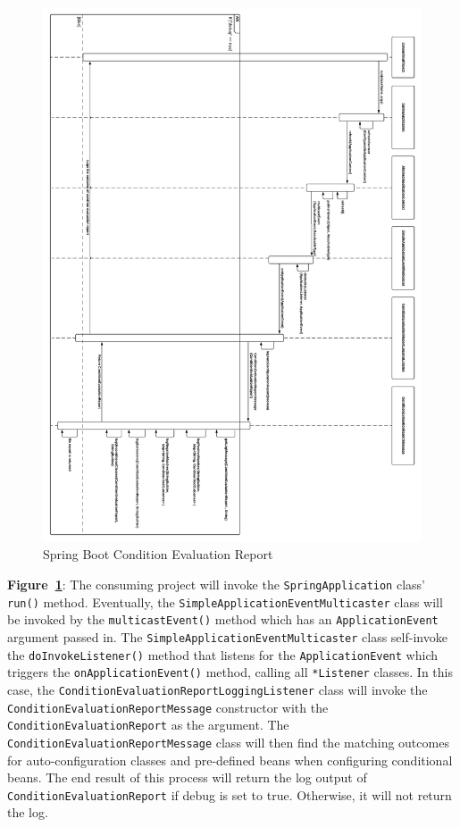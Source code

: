 \begin{figure}[H]
    \centering
    \includegraphics[width=\textwidth, height=\textheight, keepaspectratio]{content/architectural-views-top-level/condition-evaluation-report.png}
    \caption{Spring Boot Condition Evaluation Report}
    \label{sequence-diagram-condition-evaluation-report}
\end{figure}

\textbf{Figure~\ref{sequence-diagram-condition-evaluation-report}}: The consuming project will invoke the \texttt{SpringApplication} class' \texttt{run()} method. Eventually, the \texttt{SimpleApplicationEventMulticaster} class will be invoked by the \texttt{multicastEvent()} method which has an \texttt{ApplicationEvent} argument passed in. The \texttt{SimpleApplicationEventMulticaster} class self-invoke the \texttt{doInvokeListener()} method that listens for the \texttt{ApplicationEvent} which triggers the \texttt{onApplicationEvent()} method, calling all \texttt{*Listener} classes. In this case, the \texttt{ConditionEvaluationReportLoggingListener} class will invoke the \texttt{ConditionEvaluationReportMessage} constructor with the \texttt{ConditionEvaluationReport} as the argument. The \texttt{ConditionEvaluationReportMessage} class will then find the matching outcomes for auto-configuration classes and pre-defined beans when configuring conditional beans. The end result of this process will return the log output of \texttt{ConditionEvaluationReport} if debug is set to true. Otherwise, it will not return the log.

